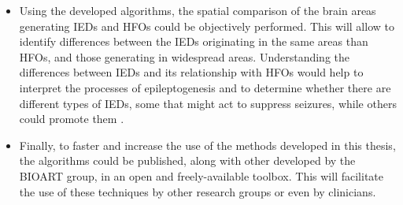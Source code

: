 \begin{itemize}
\item Using the developed algorithms, the spatial comparison of the brain areas generating IEDs and HFOs could be objectively performed. This will allow to identify differences between the IEDs originating in the same areas than HFOs, and those generating in widespread areas. Understanding the differences between IEDs and its relationship with HFOs would help to interpret the processes of epileptogenesis and to determine whether there are different types of IEDs, some that might act to suppress seizures, while others could promote them \citep{Staba2011}.

\item Finally, to faster and increase the use of the methods developed in this thesis, the algorithms could be published, along with other developed by the BIOART group, in an open and freely-available toolbox. This will facilitate the use of these techniques by other research groups or even by clinicians.

\end{itemize}



